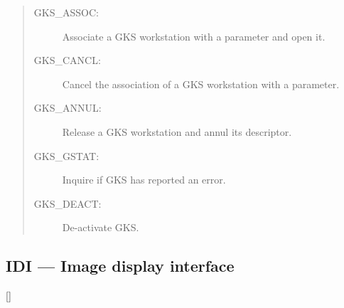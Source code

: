 \begin{quote}
\begin{description}
\item [GKS\_ASSOC:]  Associate a GKS workstation with a parameter and open it.
\item [GKS\_CANCL:]  Cancel the association of a GKS workstation with a parameter.
\item [GKS\_ANNUL:]  Release a GKS workstation and annul its descriptor.
\item [GKS\_GSTAT:]  Inquire if GKS has reported an error.
\item [GKS\_DEACT:]  De-activate GKS.
\end{description}
\end{quote}

\newpage

\subsection{IDI --- Image display interface}

\vspace{-9mm}

\hfill []

\vspace{2mm}

